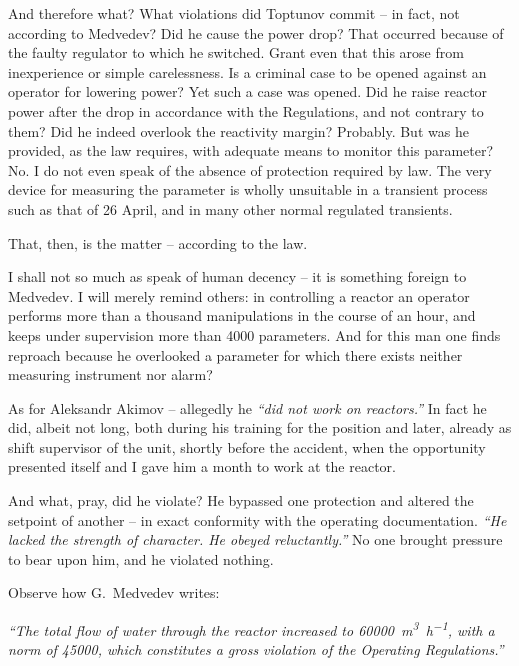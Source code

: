 \documentclass[openright]{bookest}
\begin{document}
And therefore what? What violations did Toptunov commit -- in fact, not according to Medvedev? Did he cause the power drop? That occurred because of the faulty regulator to which he switched. Grant even that this arose from inexperience or simple carelessness. Is a criminal case to be opened against an operator for lowering power? Yet such a case was opened. Did he raise reactor power after the drop in accordance with the Regulations, and not contrary to them? Did he indeed overlook the reactivity margin? Probably. But was he provided, as the law requires, with adequate means to monitor this parameter? No. I do not even speak of the absence of protection required by law. The very device for measuring the parameter is wholly unsuitable in a transient process such as that of 26 April, and in many other normal regulated transients.

That, then, is the matter -- according to the law.

I shall not so much as speak of human decency -- it is something foreign to Medvedev. I will merely remind others: in controlling a reactor an operator performs more than a thousand manipulations in the course of an hour, and keeps under supervision more than \num{4000} parameters. And for this man one finds reproach because he overlooked a parameter for which there exists neither measuring instrument nor alarm?

As for Aleksandr Akimov -- allegedly he \textit{``did not work on reactors.''} In fact he did, albeit not long, both during his training for the position and later, already as shift supervisor of the unit, shortly before the accident, when the opportunity presented itself and I gave him a month to work at the reactor.

And what, pray, did he violate? He bypassed one protection and altered the setpoint of another -- in exact conformity with the operating documentation. \textit{``He lacked the strength of character. He obeyed reluctantly.''} No one brought pressure to bear upon him, and he violated nothing.

Observe how G.~Medvedev writes:

\begin{personal}
\textit{``The total flow of water through the reactor increased to \qty{60000}{\meter\cubed\per\hour}, with a norm of \num{45000}, which constitutes a gross violation of the Operating Regulations.''}
\end{personal}
\end{document}
